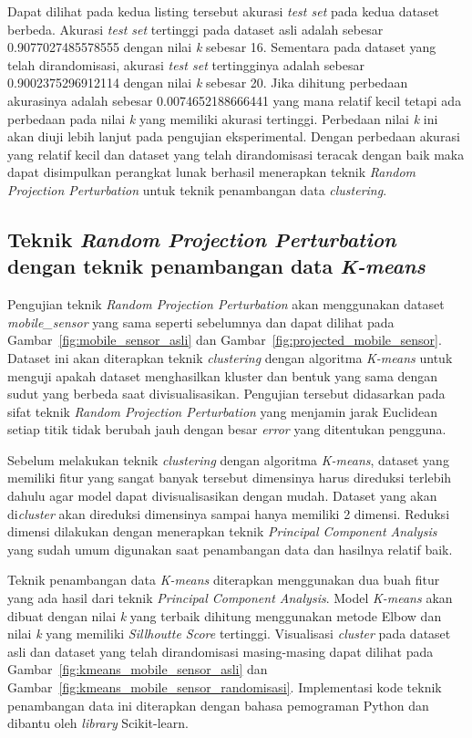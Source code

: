 Dapat dilihat pada kedua listing tersebut akurasi \textit{test set} pada kedua dataset berbeda. Akurasi \textit{test set} tertinggi pada dataset asli adalah sebesar 0.9077027485578555 dengan nilai \textit{k} sebesar 16. Sementara pada dataset yang telah dirandomisasi, akurasi \textit{test set} tertingginya adalah sebesar 0.9002375296912114 dengan nilai \textit{k} sebesar 20. Jika dihitung perbedaan akurasinya adalah sebesar 0.0074652188666441 yang mana relatif kecil tetapi ada perbedaan pada nilai \textit{k} yang memiliki akurasi tertinggi. Perbedaan nilai \textit{k} ini akan diuji lebih lanjut pada pengujian eksperimental. Dengan perbedaan akurasi yang relatif kecil dan dataset yang telah dirandomisasi teracak dengan baik maka dapat disimpulkan perangkat lunak berhasil menerapkan teknik \textit{Random Projection Perturbation} untuk teknik penambangan data \textit{clustering}.

\subsection{Teknik \textit{Random Projection Perturbation} dengan teknik penambangan data \textit{K-means}}
\label{sec:rpp-kmeans}

Pengujian teknik \textit{Random Projection Perturbation} akan menggunakan dataset \textit{mobile\_sensor} yang sama seperti sebelumnya dan dapat dilihat pada Gambar~\ref{fig:mobile_sensor_asli} dan Gambar~\ref{fig:projected_mobile_sensor}. Dataset ini akan diterapkan teknik \textit{clustering} dengan algoritma \textit{K-means} untuk menguji apakah dataset menghasilkan kluster dan bentuk yang sama dengan sudut yang berbeda saat divisualisasikan. Pengujian tersebut didasarkan pada sifat teknik \textit{Random Projection Perturbation} yang menjamin jarak Euclidean setiap titik tidak berubah jauh dengan besar \textit{error} yang ditentukan pengguna.

Sebelum melakukan teknik \textit{clustering} dengan algoritma \textit{K-means}, dataset yang memiliki fitur yang sangat banyak tersebut dimensinya harus direduksi terlebih dahulu agar model dapat divisualisasikan dengan mudah. Dataset yang akan di\textit{cluster} akan direduksi dimensinya sampai hanya memiliki 2 dimensi. Reduksi dimensi dilakukan dengan menerapkan teknik \textit{Principal Component Analysis} yang sudah umum digunakan saat penambangan data dan hasilnya relatif baik.

Teknik penambangan data \textit{K-means} diterapkan menggunakan dua buah fitur yang ada hasil dari teknik \textit{Principal Component Analysis}. Model \textit{K-means} akan dibuat dengan nilai \textit{k} yang terbaik dihitung menggunakan metode Elbow dan nilai \textit{k} yang memiliki \textit{Sillhoutte Score} tertinggi. Visualisasi \textit{cluster} pada dataset asli dan dataset yang telah dirandomisasi masing-masing dapat dilihat pada Gambar~\ref{fig:kmeans_mobile_sensor_asli} dan Gambar~\ref{fig:kmeans_mobile_sensor_randomisasi}. Implementasi kode teknik penambangan data ini diterapkan dengan bahasa pemograman Python dan dibantu oleh \textit{library} Scikit-learn. 

